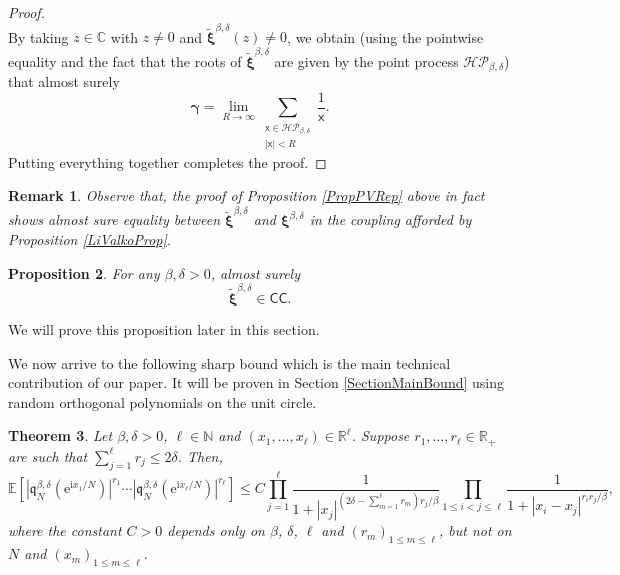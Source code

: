 \documentclass[]{article}
\newtheorem{thm}{Theorem}[section]
\newtheorem{rmk}[thm]{Remark}
\newtheorem{prop}[thm]{Proposition}
\begin{document}
\begin{proof}
\begin{equation*}
\end{equation*}
By taking $z \in \mathbb{C}$ with $z\neq 0$ and $\tilde{\boldsymbol{\xi}}^{\beta,\delta}(z)\neq 0$, we obtain (using the pointwise equality and the fact that the roots of 
$\tilde{\boldsymbol{\xi}}^{\beta,\delta}$ are given by the point process $ \mathcal{HP}_{\beta,\delta}$) that almost surely
\begin{equation*}
\boldsymbol{\gamma}=\lim_{R\to \infty}\sum_{\substack{\mathsf{x} \in \mathcal{HP}_{\beta,\delta} \\ |\mathsf{x}|<R}}\frac{1}{\mathsf{x}}.
\end{equation*}
Putting everything together completes the proof.
\end{proof}

\begin{rmk}
Observe that, the proof of Proposition \ref{PropPVRep} above in fact shows almost sure equality between $\tilde{\boldsymbol{\xi}}^{\beta,\delta}$ and $\boldsymbol{\xi}^{\beta,\delta}$ in the coupling afforded by Proposition \ref{LiValkoProp}.
\end{rmk}

\begin{prop}\label{CartwrightProp}
For any $\beta, \delta>0$, almost surely
\begin{equation*}
\tilde{\boldsymbol{\xi}}^{\beta,\delta}\in \mathsf{CC}.
\end{equation*}
\end{prop}
We will prove this proposition later in this section.

We now arrive to the following sharp bound which is the main technical contribution of our paper. It will be proven in Section \ref{SectionMainBound} using random orthogonal polynomials on the unit circle.
\begin{thm}\label{MainBound}
Let $\beta,\delta>0$, $\ell \in \mathbb{N}$ and $(x_1,\dots,x_\ell) \in \mathbb{R}^\ell$. Suppose $r_1,\dots,r_\ell \in \mathbb{R}_+$ are such that $\sum_{j=1}^\ell r_j\le2\delta$. Then,
\begin{equation}
\mathbb{E}\left[\left|\mathfrak{q}_N^{\beta,\delta}(\mathrm{e}^{\mathrm{i}x_1/N})\right|^{r_1}\cdots \left|\mathfrak{q}_N^{\beta,\delta}(\mathrm{e}^{\mathrm{i}x_\ell/N})\right|^{r_\ell}\right]\le C \prod_{j=1}^\ell \frac{1}{1+|x_j|^{(2\delta-\sum_{m=1}^\ell r_m)r_j/\beta}} \prod_{1\le i < j\le \ell} \frac{1}{1+|x_i-x_j|^{r_ir_j/\beta}},
\end{equation}
where the constant $C > 0$ depends only on 
$\beta$, $\delta$, $\ell$ and $(r_m)_{1 \leq m \leq \ell}$, but not on $N$ and $(x_m)_{1 \leq m \leq \ell}$. 
\end{thm}
\end{document}
